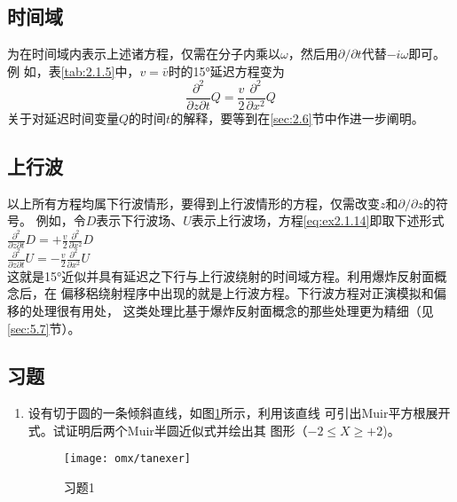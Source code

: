 \subsection{时间域}
为在时间域内表示上述诸方程，仅需在分子内乘以$\omega$，然后用$\partial/\partial t$代替$-i\omega$即可。例
如，表\ref{tab:2.1.5}中，$v=\bar{v}$时的15°延迟方程变为
\begin{equation}
\frac{\partial^2}{\partial z\partial t}Q=\frac{v}{2}\frac{\partial^2}{\partial x^2}Q
\label{eq:ex2.1.14}
\end{equation}
关于对延迟时间变量$Q$的时间$t$的解释，要等到在\ref{sec:2.6}节中作进一步阐明。
\subsection{上行波}
以上所有方程均属下行波情形，要得到上行波情形的方程，仅需改变$z$和$\partial/\partial z$的符号。
例如，令$D$表示下行波场、$U$表示上行波场，方程\ref{eq:ex2.1.14}即取下述形式\\
$\frac{\partial^2}{\partial z\partial t}D=+\frac{v}{2}\frac{\partial^2}{\partial x^2}D$\\
$\frac{\partial^2}{\partial z\partial t}U=-\frac{v}{2}\frac{\partial^2}{\partial x^2}U$\\
这就是15°近似并具有延迟之下行与上行波绕射的时间域方程。利用爆炸反射面概念后，在
偏移稆绕射程序中出现的就是上行波方程。下行波方程对正演模拟和偏移的处理很有用处，
这类处理比基于爆炸反射面概念的那些处理更为精细（见\ref{sec:5.7}节）。
\subsection{习题}
\begin{enumerate}
\item 设有切于圆的一条倾斜直线，如图\ref{fig:omx/tanexer}所示，利用该直线
可引出Muir平方根展开式。试证明后两个Muir半圆近似式并绘出其
图形（$-2\leq X\geq +2$)。
\begin{figure}[H]
\centering
\texttt{[image: omx/tanexer]}
\caption{习题1}
\label{fig:omx/tanexer}
\end{figure}
\end{enumerate}

